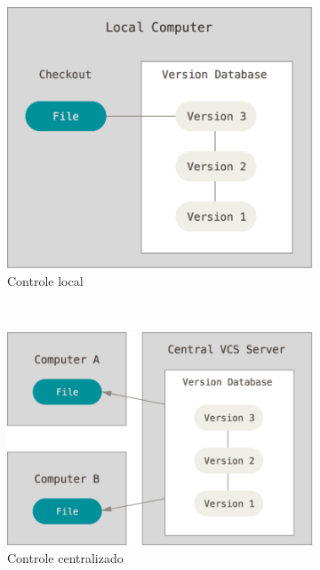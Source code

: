 \begin{figure}[h]
	\centering
    \begin{subfigure}[b]{0.3\textwidth}
      \includegraphics[width=\textwidth]{pfc/figuras/control-version-local.png}
      \caption{Controle local}
      \label{fig:version-control-local}
    \end{subfigure}
    ~
	\begin{subfigure}[b]{0.3\textwidth}
      \includegraphics[width=\textwidth]{pfc/figuras/control-version-centralized.png}
      \caption{Controle centralizado}
      \label{fig:version-control-centralized}
    \end{subfigure}
    ~
	\begin{subfigure}[b]{0.3\textwidth}

\end{subfigure}
\end{figure}
